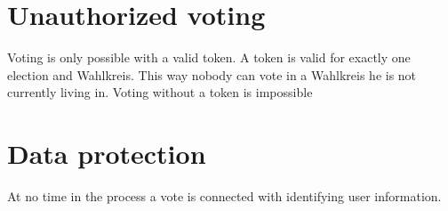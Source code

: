 \documentclass[10pt,a4paper]{article}
\begin{document}
\section*{Unauthorized voting}
Voting is only possible with a valid token. A token is valid for exactly one election and Wahlkreis. This way nobody can vote in a Wahlkreis he is not currently living in. Voting without a token is impossible

\section*{Data protection}
At no time in the process a vote is connected with identifying user information. 
\end{document}
